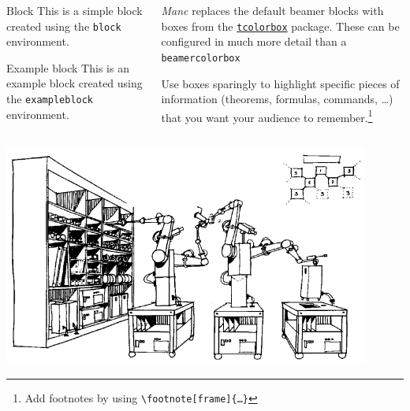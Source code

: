 \documentclass[compress, aspectratio = 32]{beamer}
\begin{document}
\begin{frame}[fragile]
  \begin{columns}
    \begin{column}{0.5\textwidth}
      \begin{block}{Block}
        This is a simple block created using the \texttt{block} environment.
      \end{block}
      \begin{exampleblock}{Example block}
        This is an example block created using the \texttt{exampleblock} environment.
      \end{exampleblock}
    \end{column}
    \begin{column}{0.5\textwidth}
      \emph{Manc} replaces the default beamer blocks with boxes from the \href{https://www.ctan.org/pkg/tcolorbox}{\texttt{tcolorbox}} package.
      These can be configured in much more detail than a \texttt{beamercolorbox}
      \medskip

      Use boxes sparingly to highlight specific pieces of information (theorems, formulas, commands, …) that you want your audience to remember.\footnote[frame]{Add footnotes by using \texttt{\backslash footnote[frame]\{…\}}}
    \end{column}
  \end{columns}
\end{frame}

\begin{frame}
  \centering
  \includegraphics[width=0.9\textwidth]{./graphics/self-replicating.png}
\end{frame}

\begin{darkframe}[c,noframenumbering]
\end{darkframe}

\end{document}
